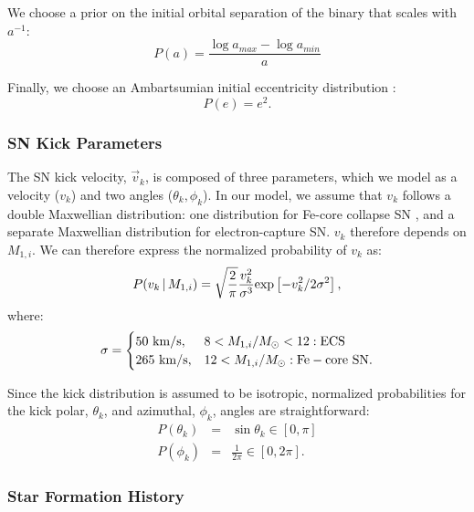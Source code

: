 \documentclass[12pt, preprint]{aastex}
\newcommand{\given}{\,|\,}
\newcommand{\Msun}{\ifmmode {M_{\odot}}\else${M_{\odot}}$\fi}
\begin{document}
We choose a prior on the initial orbital separation of the binary that scales with $a^{-1}$:
\begin{equation}
P(a) = \frac{\log a_{max} - \log a_{min}}{a}
\end{equation}

Finally, we choose an Ambartsumian initial eccentricity distribution \citep{ambartsumian37, duquennoy91}:
\begin{equation}
P(e) = e^2.
\end{equation}


\subsubsection{SN Kick Parameters}

The SN kick velocity, $\vec{v}_k$, is composed of three parameters, which we model as a velocity ($v_k$) and two angles ($\theta_k, \phi_k$). In our model, we assume that $v_k$ follows a double Maxwellian distribution: one distribution for Fe-core collapse SN \citep[with a dispersion of 265 km s$^{-1}$][]{hobbs05}, and a separate Maxwellian distribution for electron-capture SN. $v_k$ therefore depends on $M_{1,i}$. We can therefore express the normalized probability of $v_k$ as:
\begin{equation}
P(v_k \given M_{1,i}) = \sqrt{\frac{2}{\pi}} \frac{v_k^2} {\sigma^3} {\rm exp} \left[ -v_k^2 / 2 \sigma^2 \right], \label{eq:P_v_k}
\end{equation}
where:
\begin{equation}
\sigma = 
\begin{cases} 
      50\ {\rm km/s}, & 8 < M_{1,i}/\Msun < 12: {\rm ECS}\\
     265\ {\rm km/s}, & 12 < M_{1,i}/\Msun: {\rm Fe-core\ SN}.
   \end{cases}
\end{equation}


Since the kick distribution is assumed to be isotropic, normalized probabilities for the kick polar, $\theta_k$, and azimuthal, $\phi_k$, angles are straightforward:
\begin{eqnarray}
P(\theta_k) &=& \sin \theta_k \in [0, \pi] \label{eq:P_theta_k} \\
P(\phi_k) &=& \frac{1}{2 \pi} \in [0, 2\pi] . \label{eq:P_phi_k}
\end{eqnarray}



\subsubsection{Star Formation History}
\end{document}
